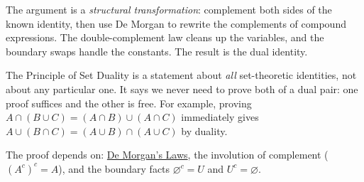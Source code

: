 \begin{remark*}
The argument is a \emph{structural transformation}: complement both sides of the
known identity, then use De Morgan to rewrite the complements of compound
expressions. The double-complement law cleans up the variables, and the
boundary swaps handle the constants. The result is the dual identity.
\end{remark*}

\begin{remark*}
The Principle of Set Duality is a statement about \emph{all} set-theoretic
identities, not about any particular one. It says we never need to prove both
of a dual pair: one proof suffices and the other is free. For example,
proving $A \cap (B \cup C) = (A \cap B) \cup (A \cap C)$ immediately gives
$A \cup (B \cap C) = (A \cup B) \cap (A \cup C)$ by duality.
\end{remark*}

\begin{remark*}[Dependencies]
The proof depends on: \hyperref[thm:de-morgan]{De Morgan's Laws}, the involution
of complement ($(A^c)^c = A$), and the boundary facts $\varnothing^c = U$ and
$U^c = \varnothing$.
\end{remark*}
